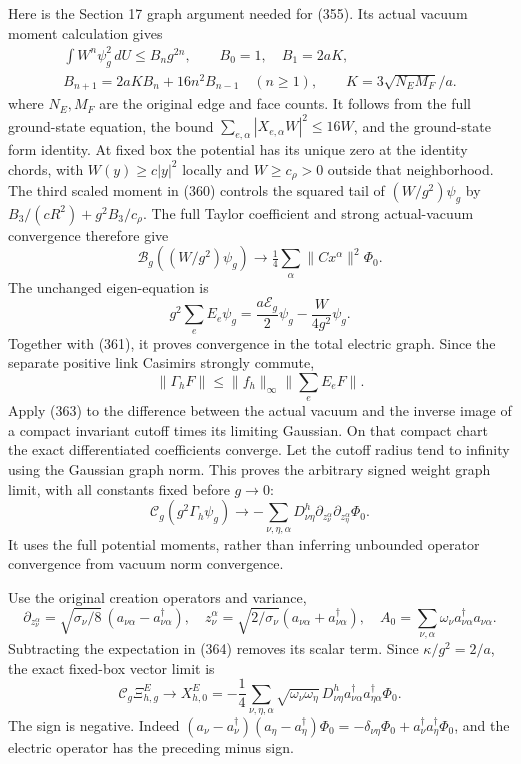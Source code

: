 \documentclass[
  11pt,
]{article}
\begin{document}
Here is the Section 17 graph argument needed for (355). Its actual
vacuum moment calculation gives \[
 \begin{gathered}
 \int W^n\psi_g^2\,dU\le B_ng^{2n},\qquad
 B_0=1,\quad B_1=2aK,\\
 B_{n+1}=2aKB_n+16n^2B_{n-1}\quad(n\ge1),\qquad
 K=3\sqrt{N_EM_F}/a .
 \end{gathered}
 \tag{360}
\] where \(N_E,M_F\) are the original edge and face counts. It follows
from the full ground-state equation, the bound
\(\sum_{e,\alpha}|X_{e,\alpha}W|^2\le16W\), and the ground-state form
identity. At fixed box the potential has its unique zero at the identity
chords, with \(W(y)\ge c|y|^2\) locally and \(W\ge c_\rho>0\) outside
that neighborhood. The third scaled moment in (360) controls the squared
tail of \((W/g^2)\psi_g\) by \(B_3/(cR^2)+g^2B_3/c_\rho\). The full
Taylor coefficient and strong actual-vacuum convergence therefore give
\[
 \mathcal B_g((W/g^2)\psi_g)
 \longrightarrow \tfrac14\sum_\alpha\|Cx^\alpha\|^2\Phi_0.
 \tag{361}
\] The unchanged eigen-equation is \[
 g^2\sum_eE_e\psi_g
 =\frac{a\mathcal E_g}{2}\psi_g-\frac{W}{4g^2}\psi_g.
 \tag{362}
\] Together with (361), it proves convergence in the total electric
graph. Since the separate positive link Casimirs strongly commute, \[
 \|\Gamma_hF\|\le\|f_h\|_\infty\|\textstyle\sum_eE_eF\|.
 \tag{363}
\] Apply (363) to the difference between the actual vacuum and the
inverse image of a compact invariant cutoff times its limiting Gaussian.
On that compact chart the exact differentiated coefficients converge.
Let the cutoff radius tend to infinity using the Gaussian graph norm.
This proves the arbitrary signed weight graph limit, with all constants
fixed before \(g\to0\): \[
 \mathcal C_g(g^2\Gamma_h\psi_g)
 \longrightarrow
 -\sum_{\nu,\eta,\alpha}D^h_{\nu\eta}
          \partial_{z_\nu^\alpha}\partial_{z_\eta^\alpha}\Phi_0.
 \tag{364}
\] It uses the full potential moments, rather than inferring unbounded
operator convergence from vacuum norm convergence.

Use the original creation operators and variance, \[
 \partial_{z_\nu^\alpha}
 =\sqrt{\sigma_\nu/8}\,(a_{\nu\alpha}-a_{\nu\alpha}^\dagger),
 \quad
 z_\nu^\alpha=\sqrt{2/\sigma_\nu}
                    (a_{\nu\alpha}+a_{\nu\alpha}^\dagger),
 \quad
 A_0=\sum_{\nu,\alpha}\omega_\nu
                      a_{\nu\alpha}^\dagger a_{\nu\alpha}.
 \tag{365}
\] Subtracting the expectation in (364) removes its scalar term. Since
\(\kappa/g^2=2/a\), the exact fixed-box vector limit is \[
 \boxed{\mathcal C_g\Xi^E_{h,g}\longrightarrow
 X^E_{h,0}
 =-\frac14\sum_{\nu,\eta,\alpha}
     \sqrt{\omega_\nu\omega_\eta}\,D^h_{\nu\eta}
          a_{\nu\alpha}^\dagger a_{\eta\alpha}^\dagger\Phi_0.}
 \tag{366}
\] The sign is negative. Indeed
\((a_\nu-a_\nu^\dagger)(a_\eta-a_\eta^\dagger)\Phi_0
=-\delta_{\nu\eta}\Phi_0+
a_\nu^\dagger a_\eta^\dagger\Phi_0\), and the electric operator has the
preceding minus sign.
\end{document}
